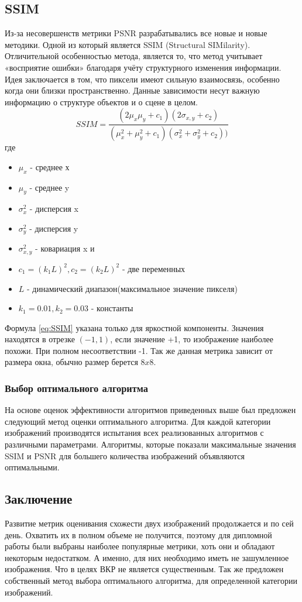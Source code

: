 \subsection{SSIM}
Из-за несовершенств метрики PSNR разрабатывались все новые и новые методики. Одной из который является SSIM (Structural SIMilarity). Отличительной особенностью метода, является то, что метод учитывает «восприятие ошибки» благодаря учёту структурного изменения информации. Идея заключается в том, что пиксели имеют сильную взаимосвязь, особенно когда они близки пространственно. Данные зависимости несут важную информацию о структуре объектов и о сцене в целом.
\begin{equation}\label{eq:SSIM}
SSIM = \frac{(2\mu_x\mu_y+c_1)(2\sigma_{x,y}+c_2)}{(\mu_x^2+\mu_y^2+c_1)(\sigma_x^2+\sigma_y^2+c_2))}
\end{equation}
где
\begin{itemize}
	\item $\mu_x$ - среднее х
	\item $\mu_y$ - среднее y
	\item $\sigma_x^2$ - дисперсия x
	\item $\sigma_y^2$ - дисперсия y
	\item $\sigma_{x,y}^2$ - ковариация x и \item $c_1=(k_1L)^2, c_2=(k_2L)^2$ - две переменных
	\item $L$ - динамический диапазон(максимальное значение пикселя)  
	\item $k_1=0.01, k_2=0.03$ - константы
\end{itemize}
Формула \ref{eq:SSIM} указана только для яркостной компоненты. Значения находятся в отрезке $(-1,1)$, если значение +1, то изображение наиболее похожи. При полном несоответствии -1. Так же данная метрика зависит от размера окна, обычно размер берется $8x8$.\

\subsubsection{Выбор оптимального алгоритма}
На основе оценок эффективности алгоритмов приведенных выше был предложен следующий метод оценки оптимального алгоритма. Для каждой категории изображений производятся испытания всех реализованных алгоритмов с различными параметрами. Алгоритмы, которые показали максимальные значения SSIM и PSNR для большего количества изображений объявляются оптимальными.

\subsection{Заключение}
Развитие метрик оценивания схожести двух изображений продолжается и по сей день. Охватить их в полном объеме не получится, поэтому для дипломной работы были выбраны наиболее популярные метрики, хоть они и обладают некоторым недостатком. А именно, для них необходимо иметь не зашумленное изображения. Что в целях ВКР не является существенным.
Так же предложен собственный метод выбора оптимального алгоритма, для определенной категории изображений.